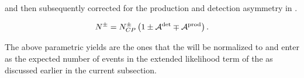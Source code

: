 \noindent and then subsequently corrected for the production and detection asymmetry in .

\begin{equation}
N^{\pm} = N^{\pm}_{CP}  \left( 1 \pm \mathcal{A}^{\text{det}} \mp \mathcal{A}^{\text{prod}} \right).
\label{norm_yields}
\end{equation}

\noindent The above parametric yields are the ones that the \pdfs will be normalized to and enter as the expected number of events in the extended
likelihood term of the \pdfs as discussed earlier in the current subsection.
